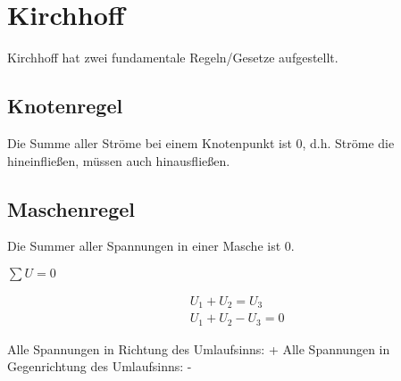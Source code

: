 \chapter{Kirchhoff}
Kirchhoff hat zwei fundamentale Regeln/Gesetze aufgestellt.

\section{Knotenregel}
Die Summe aller Ströme bei einem Knotenpunkt ist 0, d.h. Ströme die hineinfließen, müssen auch hinausfließen.

\section{Maschenregel}
Die Summer aller Spannungen in einer Masche ist 0.

$\sum U = 0$

\begin{align}
    &U_1 + U_2 = U_3        \\
    &U_1 + U_2 - U_3 = 0
\end{align}

Alle Spannungen in Richtung des Umlaufsinns: +
Alle Spannungen in Gegenrichtung des Umlaufsinns: -